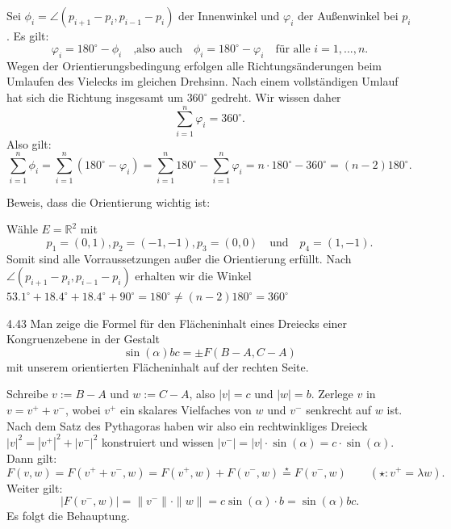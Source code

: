 Sei $\phi_i = \angle (p_{i+1}-p_i, p_{i-1}-p_i)$ der Innenwinkel und $\varphi_i$ der Au\ss enwinkel bei $p_i$.
Es gilt:
\[
    \varphi_i = 180^\circ - \phi_i \quad \text{,also auch} \quad \phi_i = 180^\circ - \varphi_i \quad \text{für alle } i = 1, ..., n.
\]
Wegen der Orientierungsbedingung erfolgen alle Richtungsänderungen beim
Umlaufen des Vielecks im gleichen Drehsinn. Nach einem vollständigen Umlauf
hat sich die Richtung insgesamt um \(360^\circ\) gedreht.
Wir wissen daher
\[
    \sum_{i=1}^{n} \varphi_i = 360^\circ.
\]
Also gilt:
\[
    \sum_{i=1}^{n}\phi_i = \sum_{i=1}^{n}( 180^\circ - \varphi_i) = \sum_{i=1}^{n}180^\circ - \sum_{i=1}^{n} \varphi_i = n \cdot 180^\circ - 360^\circ = (n-2) 180^\circ.
\]

\begin{minipage}{0.69\linewidth}
    Beweis, dass die Orientierung wichtig ist:

    Wähle $E = \mathbb R^2$ mit
    \[
        p_1 = (0,1), p_2 = (-1, -1), p_3 = (0, 0) \quad \text{und} \quad p_4 = (1, -1).
    \]
    Somit sind alle Vorraussetzungen au\ss er die Orientierung erfüllt.
    Nach $\angle (p_{i+1}-p_i, p_{i-1}-p_i)$ erhalten wir die Winkel \(53.1^\circ + 18.4^\circ + 18.4^\circ + 90^\circ = 180^\circ \neq (n-2)180^\circ = 360^\circ\)
\end{minipage}
\begin{minipage}{0.3\linewidth}
    
\end{minipage}


\begin{exercise}{4.4}{3}
    Man zeige die Formel für den Flächeninhalt eines Dreiecks einer Kongruenzebene in der Gestalt
    \[
        \sin(\alpha)bc = \pm F(B-A,C-A)
    \]    
    mit unserem orientierten Flächeninhalt auf der rechten Seite.
\end{exercise}

Schreibe $v:=B-A$ und $w:= C-A$, also $|v| = c$ und $|w| = b$. Zerlege $v$ in $v = v^+ + v^-$, wobei $v^+$ ein skalares Vielfaches von $w$ und $v^-$ senkrecht auf $w$ ist.
Nach dem Satz des Pythagoras haben wir also ein rechtwinkliges Dreieck $|v|^2 = |v^+|^2 + |v^-|^2$ konstruiert und wissen $|v^-| = |v| \cdot \sin(\alpha) = c \cdot \sin(\alpha)$.
Dann gilt:
\[
    F(v,w)=F(v^++v^-,w) = F(v^+, w) + F(v^-, w) \overset{\star}{=} F(v^-, w) \qquad ({\scriptstyle\star}: v^+ =  \lambda w).
\]
Weiter gilt:
\[
    |F(v^-,w)| = \|v^-\|\cdot \|w\|= c \sin(\alpha) \cdot b = \sin(\alpha)bc.
\]
Es folgt die Behauptung.